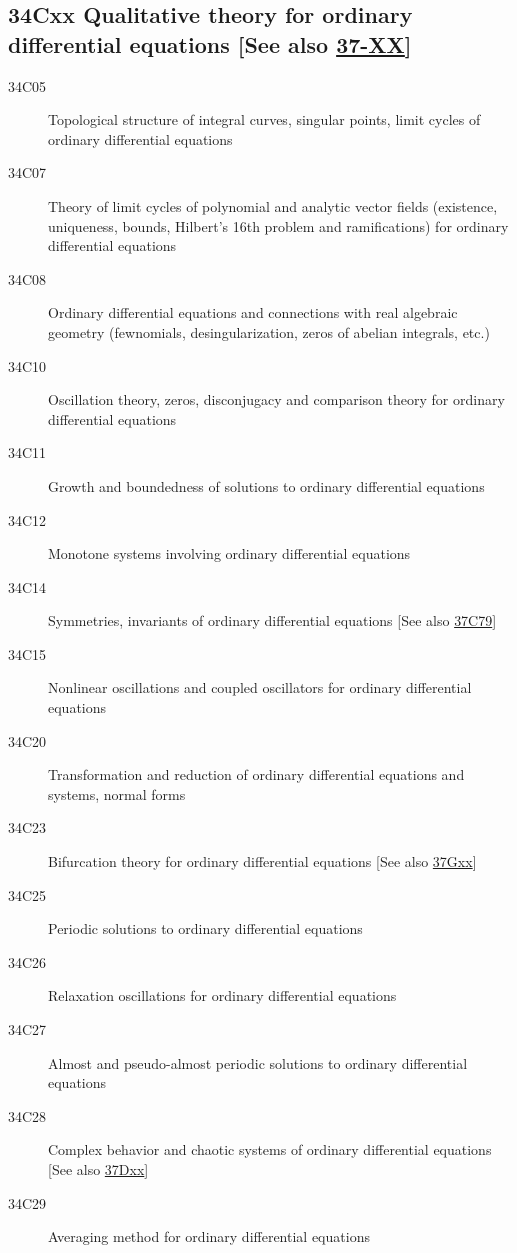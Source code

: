 \subsection*{34Cxx  Qualitative theory for ordinary differential equations [See also \hyperref[37-XX]{37-XX}] }\label{34Cxx}
\begin{description}  
\item [34C05]\label{34C05} Topological structure of integral curves, singular points, limit cycles of ordinary differential equations
\item [34C07]\label{34C07} Theory of limit cycles of polynomial and analytic vector fields (existence, uniqueness, bounds, Hilbert's 16th problem and ramifications) for ordinary differential equations
\item [34C08]\label{34C08} Ordinary differential equations and connections with real algebraic geometry (fewnomials, desingularization, zeros of abelian integrals, etc.)
\item [34C10]\label{34C10} Oscillation theory, zeros, disconjugacy and comparison theory for ordinary differential equations
\item [34C11]\label{34C11} Growth and boundedness of solutions to ordinary differential equations
\item [34C12]\label{34C12} Monotone systems involving ordinary differential equations
\item [34C14]\label{34C14} Symmetries, invariants of ordinary differential equations [See also \hyperref[37C79]{37C79}]
\item [34C15]\label{34C15} Nonlinear oscillations and coupled oscillators for ordinary differential equations
\item [34C20]\label{34C20} Transformation and reduction of ordinary differential equations and systems, normal forms
\item [34C23]\label{34C23} Bifurcation theory for ordinary differential equations [See also \hyperref[37Gxx]{37Gxx}]
\item [34C25]\label{34C25} Periodic solutions to ordinary differential equations
\item [34C26]\label{34C26} Relaxation oscillations for ordinary differential equations
\item [34C27]\label{34C27} Almost and pseudo-almost periodic solutions to ordinary differential equations
\item [34C28]\label{34C28} Complex behavior and chaotic systems of ordinary differential equations [See also \hyperref[37Dxx]{37Dxx}]
\item [34C29]\label{34C29} Averaging method for ordinary differential equations

\end{description}
